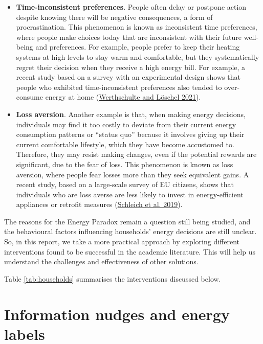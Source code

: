 \documentclass[
  12pt,
  captions=heading]{scrreport}
\begin{document}
\begin{itemize}
\item
  \textbf{Time-inconsistent preferences}. People often delay or postpone
  action despite knowing there will be negative consequences, a form of
  procrastination. This phenomenon is known as inconsistent time
  preferences, where people make choices today that are inconsistent
  with their future well-being and preferences. For example, people
  prefer to keep their heating systems at high levels to stay warm and
  comfortable, but they systematically regret their decision when they
  receive a high energy bill. For example, a recent study based on a
  survey with an experimental design shows that people who exhibited
  time-inconsistent preferences also tended to over-consume energy at
  home (\protect\hyperlink{ref-werthschulte2021role}{Werthschulte and
  Löschel 2021}).
\item
  \textbf{Loss aversion}. Another example is that, when making energy
  decisions, individuals may find it too costly to deviate from their
  current energy consumption patterns or ``status quo'' because it
  involves giving up their current comfortable lifestyle, which they
  have become accustomed to. Therefore, they may resist making changes,
  even if the potential rewards are significant, due to the fear of
  loss. This phenomenon is known as loss aversion, where people fear
  losses more than they seek equivalent gains. A recent study, based on
  a large-scale survey of EU citizens, shows that individuals who are
  loss averse are less likely to invest in energy-efficient appliances
  or retrofit measures
  (\protect\hyperlink{ref-schleich2019large}{Schleich et al. 2019}).
\end{itemize}

The reasons for the Energy Paradox remain a question still being
studied, and the behavioural factors influencing households' energy
decisions are still unclear. So, in this report, we take a more
practical approach by exploring different interventions found to be
successful in the academic literature. This will help us understand the
challenges and effectiveness of other solutions.

Table \ref{tab:households} summarises the interventions discussed below.

\hypertarget{information-nudges-and-energy-labels}{%
\section{Information nudges and energy
labels}\label{information-nudges-and-energy-labels}}
\end{document}
